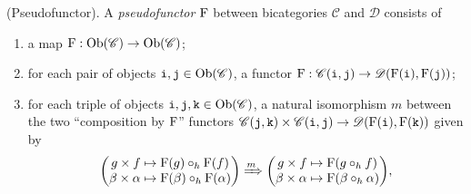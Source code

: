 \noindent\begin{definition} \textnormal{(Pseudofunctor).} A {\em pseudofunctor} $\textnormal{F}$ between bicategories $\mathscr{C}$ and $\mathscr{D}$ consists of
\begin{enumerate}[label=$\bullet$, leftmargin=4\parindent]
\item a map $\textnormal{F} : \textnormal{Ob}(\mathscr{C}) \to \textnormal{Ob}(\mathscr{C})$;
\item for each pair of objects $\textnormal{\texttt{i}}, \textnormal{\texttt{j}} \in \textnormal{Ob}(\mathscr{C})$, a functor $\textnormal{F} : \mathscr{C}(\textnormal{\texttt{i}}, \textnormal{\texttt{j}}) \to \mathscr{D}(\textnormal{F}(\textnormal{\texttt{i}}), \textnormal{F}(\textnormal{\texttt{j}}))$;
\item for each triple of objects $\textnormal{\texttt{i}}, \textnormal{\texttt{j}}, \textnormal{\texttt{k}} \in \textnormal{Ob}(\mathscr{C})$, a natural isomorphism $m$ between the two ``composition by $\textnormal{F}$'' functors $\mathscr{C}(\textnormal{\texttt{j}}, \textnormal{\texttt{k}}) \times \mathscr{C}(\textnormal{\texttt{i}}, \textnormal{\texttt{j}}) \to \mathscr{D}(\textnormal{F}(\textnormal{\texttt{i}}), \textnormal{F}(\textnormal{\texttt{k}}))$ given by
\begin{align*}
\begin{split}
\begin{pmatrix}g \times f \mapsto \textnormal{F}(g) \circ_h \textnormal{F}(f)\\\beta \times \alpha \mapsto \textnormal{F}(\beta) \circ_h \textnormal{F}(\alpha)\end{pmatrix} \xRightarrow{m} \begin{pmatrix}g \times f \mapsto \textnormal{F}(g \circ_h f)\\\beta \times \alpha \mapsto \textnormal{F}(\beta \circ_h \alpha)\end{pmatrix}\!, %
\end{split}
\end{align*}

\end{enumerate}
\end{definition}

